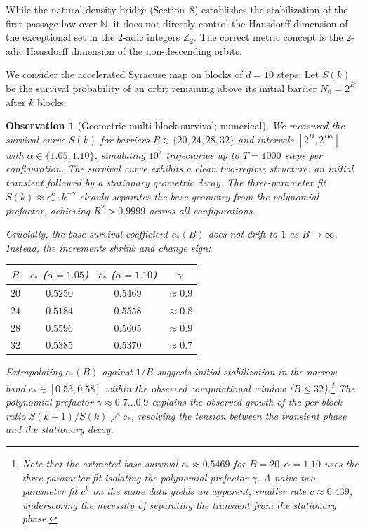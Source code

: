 \documentclass[12pt,a4paper]{article}
\newtheorem{observation}[theorem]{Observation}
\begin{document}
While the natural-density bridge (Section~8) establishes the stabilization of the first-passage law over $\mathbb{N}$, it does not directly control the Hausdorff dimension of the exceptional set in the $2$-adic integers $\mathbb{Z}_2$. The correct metric concept is the $2$-adic Hausdorff dimension of the non-descending orbits.

We consider the accelerated Syracuse map on blocks of $d=10$ steps. Let $S(k)$ be the survival probability of an orbit remaining above its initial barrier $N_0=2^B$ after $k$ blocks. 

\begin{observation}[Geometric multi-block survival; numerical]
We measured the survival curve $S(k)$ for barriers $B\in\{20, 24, 28, 32\}$ and intervals $[2^B, 2^{B\alpha}]$ with $\alpha\in\{1.05, 1.10\}$, simulating $10^7$ trajectories up to $T=1000$ steps per configuration.
The survival curve exhibits a clean two-regime structure: an initial transient followed by a stationary geometric decay. 
The three-parameter fit $S(k) \approx c_*^k \cdot k^{-\gamma}$ cleanly separates the base geometry from the polynomial prefactor, achieving $R^2 > 0.9999$ across all configurations.

Crucially, the base survival coefficient $c_*(B)$ does \emph{not} drift to $1$ as $B\to\infty$. Instead, the increments shrink and change sign:
\begin{center}
\begin{tabular}{c|ccc}
$B$ & $c_*$ ($\alpha=1.05$) & $c_*$ ($\alpha=1.10$) & $\gamma$ \\ \hline
$20$ & $0.5250$ & $0.5469$ & $\approx 0.9$ \\
$24$ & $0.5184$ & $0.5558$ & $\approx 0.8$ \\
$28$ & $0.5596$ & $0.5605$ & $\approx 0.9$ \\
$32$ & $0.5385$ & $0.5370$ & $\approx 0.7$
\end{tabular}
\end{center}
Extrapolating $c_*(B)$ against $1/B$ suggests initial stabilization in the narrow band $c_* \in [0.53, 0.58]$ within the observed computational window ($B \le 32$).\footnote{Note that the extracted base survival $c_* \approx 0.5469$ for $B=20, \alpha=1.10$ uses the three-parameter fit isolating the polynomial prefactor $\gamma$. A naive two-parameter fit $c^k$ on the same data yields an apparent, smaller rate $c \approx 0.439$, underscoring the necessity of separating the transient from the stationary phase.} The polynomial prefactor $\gamma \approx 0.7\dots 0.9$ explains the observed growth of the per-block ratio $S(k+1)/S(k) \nearrow c_*$, resolving the tension between the transient phase and the stationary decay.
\end{observation}
\end{document}
